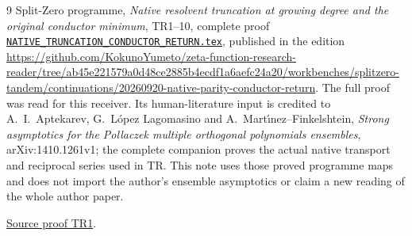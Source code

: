 \documentclass[11pt]{article}
\begin{document}
\begin{thebibliography}{9}
 Split-Zero programme, \emph{Native resolvent truncation
at growing degree and the original conductor minimum}, TR1--10,
complete proof \href{https://github.com/KokunoYumeto/zeta-function-research-reader/blob/5992ad50c0f2a06921f1fcaded7b4e38097c0739/workbenches/splitzero-tandem/continuations/20260920-original-kernel-mixed-determinants/providers/NATIVE_TRUNCATION_CONDUCTOR_RETURN.tex\#L1}{\texttt{NATIVE\_TRUNCATION\_CONDUCTOR\_RETURN.tex}},
published in the edition
\url{https://github.com/KokunoYumeto/zeta-function-research-reader/tree/ab45e221579a0d48ce2885b4ecdf1a6aefc24a20/workbenches/splitzero-tandem/continuations/20260920-native-parity-conductor-return}.
The full proof was read for this receiver. Its human-literature
input is credited to A.~I.~Aptekarev, G.~L\'opez Lagomasino and
A.~Mart\'{\i}nez--Finkelshtein, \emph{Strong asymptotics for the
Pollaczek multiple orthogonal polynomials ensembles},
arXiv:1410.1261v1; the complete companion proves the actual native
transport and reciprocal series used in TR. This note uses those
proved programme maps and does not import the author's ensemble
asymptotics or claim a new reading of the whole author paper.

\href{https://github.com/KokunoYumeto/zeta-function-research-reader/blob/5992ad50c0f2a06921f1fcaded7b4e38097c0739/workbenches/splitzero-tandem/continuations/20260920-original-kernel-mixed-determinants/providers/NATIVE_TRUNCATION_CONDUCTOR_RETURN.tex\#L54}{Source proof TR1}.
\end{thebibliography}
\end{document}
